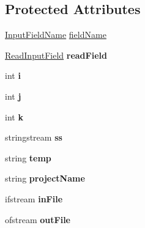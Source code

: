 \subsection*{Protected Attributes}
\begin{DoxyCompactItemize}
\item 
\hyperlink{classInputFieldName}{Input\-Field\-Name} \hyperlink{classInputDetail_ac6f85380c5152c406d483726382c4798}{field\-Name}
\item 
\hypertarget{classInputDetail_ac0cc70b017ef94fb55acb46fc44f0df5}{\hyperlink{classReadInputField}{Read\-Input\-Field} {\bfseries read\-Field}}\label{classInputDetail_ac0cc70b017ef94fb55acb46fc44f0df5}

\item 
\hypertarget{classInputDetail_a2e9226db1b744de4bf406398f48cf962}{int {\bfseries i}}\label{classInputDetail_a2e9226db1b744de4bf406398f48cf962}

\item 
\hypertarget{classInputDetail_af124a26cb4e4f86d0d9eb68200ee500b}{int {\bfseries j}}\label{classInputDetail_af124a26cb4e4f86d0d9eb68200ee500b}

\item 
\hypertarget{classInputDetail_a1bb6b8bff3d5fc6d5c998e4c451035bc}{int {\bfseries k}}\label{classInputDetail_a1bb6b8bff3d5fc6d5c998e4c451035bc}

\item 
\hypertarget{classInputDetail_a5284736b5fd3db0251cfeab7c581c0bd}{stringstream {\bfseries ss}}\label{classInputDetail_a5284736b5fd3db0251cfeab7c581c0bd}

\item 
\hypertarget{classInputDetail_abacd5d7ee7ebd7e9f36bbf3fefd13a5d}{string {\bfseries temp}}\label{classInputDetail_abacd5d7ee7ebd7e9f36bbf3fefd13a5d}

\item 
\hypertarget{classPageLayout_a8a3c1ddc422df2556fbc95d0cd575a05}{string {\bfseries project\-Name}}\label{classPageLayout_a8a3c1ddc422df2556fbc95d0cd575a05}

\item 
\hypertarget{classPageLayout_a9abec89a54a6f0dac84114919d2ad117}{ifstream {\bfseries in\-File}}\label{classPageLayout_a9abec89a54a6f0dac84114919d2ad117}

\item 
\hypertarget{classPageLayout_ad52913274f786e82e1e09f5df4bf5347}{ofstream {\bfseries out\-File}}\label{classPageLayout_ad52913274f786e82e1e09f5df4bf5347}


\end{DoxyCompactItemize}
